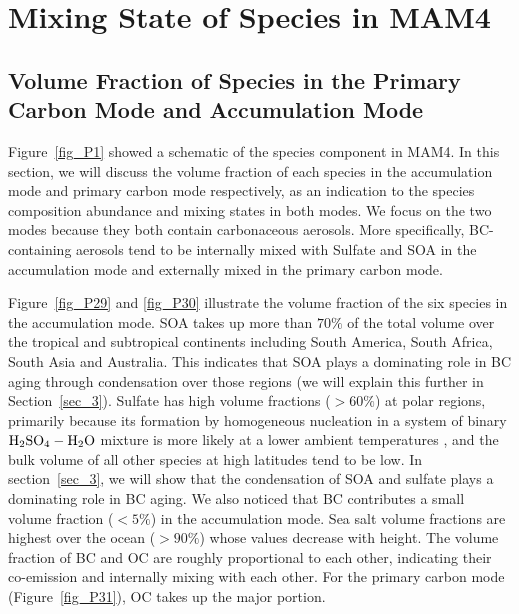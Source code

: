 \documentclass[12pt, fullpage]{uiucthesis2009_2}
\begin{document}
	\clearpage
	
	\section{Mixing State of Species in MAM4}
	\subsection{Volume Fraction of Species in the Primary Carbon Mode and Accumulation Mode}
	Figure~\ref{fig_P1} showed a schematic of the species component in MAM4. In this section, we will discuss the volume fraction of each species in the accumulation mode and primary carbon mode respectively, as an indication to the species composition abundance and mixing states in both modes. We focus on the two modes because they both contain carbonaceous aerosols. More specifically, BC-containing aerosols tend to be internally mixed with Sulfate and SOA in the accumulation mode and externally mixed in the primary carbon mode.
	
	Figure~\ref{fig_P29} and \ref{fig_P30} illustrate the volume fraction of the six species in the accumulation mode. SOA takes up more than $70\%$ of the total volume over the tropical and subtropical continents including South America, South Africa, South Asia and Australia. This indicates that SOA plays a dominating role in BC aging through condensation over those regions (we will explain this further in Section~\ref{sec_3}). Sulfate has high volume fractions ($> 60\%$) at polar regions, primarily because its formation by homogeneous nucleation in a system of binary $\rm H_{2}SO_{4}-H_{2}O$ mixture is more likely at a lower ambient temperatures \citep[e.g.][]{hamill1977nchs,yue1982temperature}, and the bulk volume of all other species at high latitudes tend to be low. In section~\ref{sec_3}, we will show that the condensation of SOA and sulfate plays a dominating role in BC aging. We also noticed that BC contributes a small volume fraction ($< 5\%$) in the accumulation mode. Sea salt volume fractions are highest over the ocean ($> 90\%$) whose values decrease with height. The volume fraction of BC and OC are roughly proportional to each other, indicating their co-emission and internally mixing with each other. For the primary carbon mode (Figure~\ref{fig_P31}), OC takes up the major portion.
	
\end{document}
